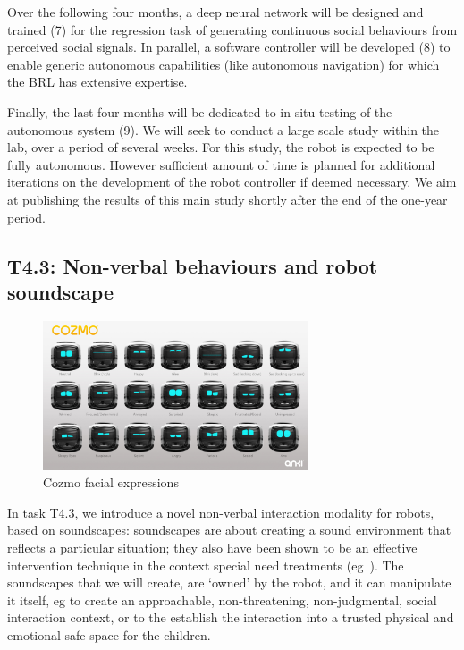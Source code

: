 \documentclass[11pt,a4paper]{report}
\begin{document}
Over the following four months, a deep neural network will be designed
and trained (7) for the regression task of generating continuous social
behaviours from perceived social signals. In parallel, a software
controller will be developed (8) to enable generic autonomous
capabilities (like autonomous navigation) for which the BRL has
extensive expertise.

Finally, the last four months will be dedicated to in-situ testing of
the autonomous system (9). We will seek to conduct a large scale study
within the lab, over a period of several weeks. For this study, the
robot is expected to be fully autonomous. However sufficient amount of
time is planned for additional iterations on the development of the
robot controller if deemed necessary. We aim at publishing the results
of this main study shortly after the end of the one-year period.


\subsection{T4.3: Non-verbal behaviours and robot soundscape}

\begin{figure}[!htbp]
\centering
    \includegraphics[width=0.7\textwidth]{figs/cozmo-expression-sheet.jpg}
\caption{Cozmo facial expressions}
\end{figure}


In task T4.3, we
introduce a novel non-verbal interaction modality for robots, based on
soundscapes: soundscapes are about creating a sound environment that reflects a
particular situation; they also have been shown to be an effective intervention
technique in the context special need treatments
(eg~\cite{greher2010soundscape}). The soundscapes that we will create, are
`owned' by the robot, and it can manipulate it itself, eg to create an
approachable, non-threatening, non-judgmental, social interaction context, or to
the establish the interaction into a trusted physical and emotional safe-space
for the children.
\end{document}

